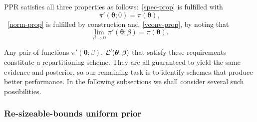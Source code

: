 \documentclass[usenatbib]{mnras}
\begin{document}

PPR satisfies all three properties as follows:~\vref{spec-prop} is
fulfilled with \[\pi'(\bm{\theta}; 0) =\pi(\bm{\theta}),\]~\cref{norm-prop} is
fulfilled by construction and~\cref{vconv-prop}, by noting that
\[\lim_{\beta \rightarrow 0} \pi'(\bm{\theta}; \beta) =
  \pi(\bm{\theta}).\]

Any pair of functions \(\pi'(\bm{\theta}; \beta)\),
\({\cal L}'(\bm{\theta}; \beta)\) that satisfy these requirements
constitute a repartitioning scheme. They are all guaranteed to yield
the same evidence and posterior, so our remaining task is to identify
schemes that produce better performance. In the following subsections
we shall consider several such possibilities.

\subsubsection{Re-sizeable-bounds uniform prior}\label{sec:orga67f872}
\end{document}
